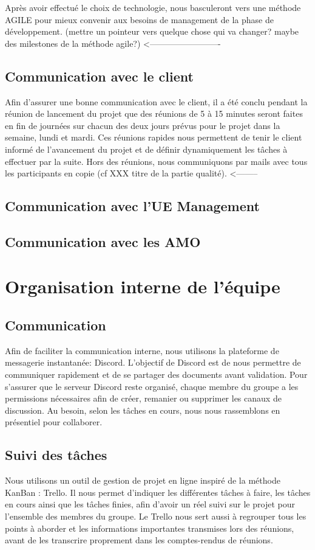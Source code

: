 \documentclass[11pt]{rapport_class}
\begin{document}
Après avoir effectué le choix de technologie, nous basculeront vers une méthode AGILE pour mieux convenir aux besoins de management de la phase de développement. (mettre un pointeur vers quelque chose qui va changer? maybe des milestones de la méthode agile?) <-------------------------

\subsection{Communication avec le client}
\qquad Afin d'assurer une bonne communication avec le client, il a été conclu pendant la réunion de lancement du projet que des réunions de 5 à 15 minutes seront faites en fin de journées sur chacun des deux jours prévus pour le projet dans la semaine, lundi et mardi. Ces réunions rapides nous permettent de tenir le client informé 
de l'avancement du projet et de définir dynamiquement les tâches à effectuer par la suite. Hors des réunions, nous communiquons par mails avec tous les participants en copie (cf XXX titre de la partie qualité). <--------

\subsection{Communication avec l'UE Management} 

\subsection{Communication avec les AMO} 

\section{Organisation interne de l'équipe}
\subsection{Communication}
\qquad Afin de faciliter la communication interne, nous utilisons la plateforme de messagerie instantanée: Discord. L'objectif de Discord est de nous permettre de communiquer rapidement et de se partager des documents avant validation. Pour s'assurer que le serveur Discord reste organisé, chaque membre du groupe a les permissions nécessaires afin de créer, remanier ou supprimer les canaux de discussion.
Au besoin, selon les tâches en cours, nous nous rassemblons en présentiel pour collaborer.

\subsection{Suivi des tâches}
\qquad Nous utilisons un outil de gestion de projet en ligne inspiré de la méthode KanBan : Trello. Il nous permet d’indiquer les différentes tâches à faire, les tâches en cours ainsi que les tâches finies, afin d’avoir un réel suivi sur le projet pour l’ensemble des membres du groupe. Le Trello nous sert aussi à regrouper tous les points à aborder et les informations importantes transmises lors des réunions, avant de les transcrire proprement dans les comptes-rendus de réunions.
\end{document}
